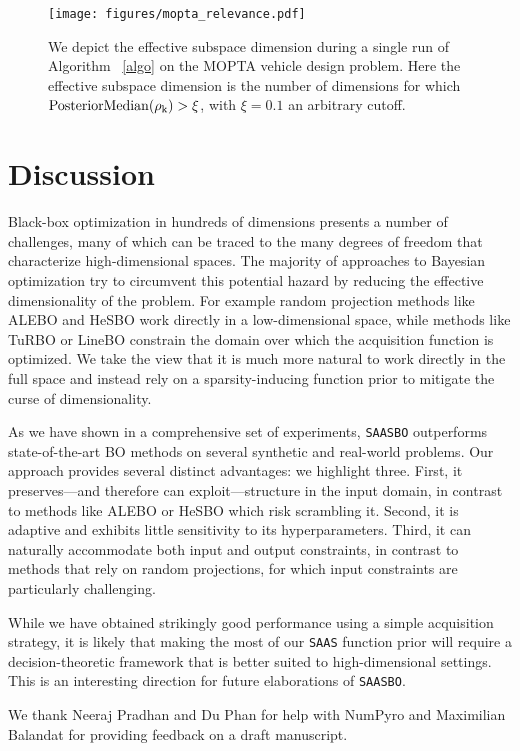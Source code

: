 \documentclass[accepted]{uai2021} %
\newcommand{\algoname}{{\texttt {SAASBO}}}
\newcommand{\priorname}{{\texttt {SAAS}}}
\begin{document}
\begin{figure}[!t]
  \centering
  \texttt{[image: figures/mopta\_relevance.pdf]}
  \caption{
  We depict the effective subspace dimension during a single run of Algorithm ~\ref{algo} on the MOPTA vehicle
    design problem. Here the effective
    subspace dimension is the number of dimensions
    for which ${\rm{PosteriorMedian}(\rho_k) > \xi}$, with $\xi=0.1$ an arbitrary cutoff.}
  \label{fig:mopta_relevance}
\end{figure}


\section{Discussion}
\label{sec:discussion}
Black-box optimization in hundreds of dimensions presents
a number of challenges, many of which can be traced to the
many degrees of freedom that characterize high-dimensional spaces.
The majority of approaches to Bayesian optimization try to circumvent this
potential hazard
by reducing the effective dimensionality of the problem.
For example random projection methods like
ALEBO and HeSBO work directly in a low-dimensional space, while
methods like TuRBO or LineBO constrain the domain over which the acquisition
function is optimized. We take the view that it is much more natural to work directly
in the full space and instead rely on a sparsity-inducing function prior to
mitigate the curse of dimensionality.

As we have shown in a comprehensive set of experiments, \algoname{} outperforms state-of-the-art BO methods on several synthetic and real-world problems.
Our approach provides several distinct advantages: we highlight three.
First, it preserves---and therefore can exploit---structure in the input domain, in contrast
to methods like ALEBO or HeSBO which risk scrambling it.
Second, it is adaptive and exhibits little sensitivity to its hyperparameters.
Third, it can naturally accommodate both input and output constraints,
in contrast to methods that rely on random projections, for which input constraints
are particularly challenging.

While we have obtained strikingly good performance using a simple acquisition strategy, it is likely that making the most of our \priorname{} function prior will require a decision-theoretic framework that is better suited to high-dimensional settings.
This is an interesting direction for future elaborations of \algoname.

\begin{acknowledgements}
    We thank Neeraj Pradhan and Du Phan for help with NumPyro and Maximilian Balandat for providing feedback on a draft manuscript.
\end{acknowledgements}
\end{document}
